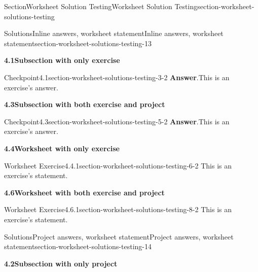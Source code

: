 \documentclass[oneside,10pt,]{article}
\newcommand{\blocktitlefont}{\relax}
\numberwithin{equation}{section}
\begin{document}
\begin{sectionptx}{Section}{Worksheet Solution Testing}{}{Worksheet Solution Testing}{}{}{section-worksheet-solutions-testing}
\typeout{************************************************}
%
\begin{solutions-subsection}{Solutions}{Inline answers, worksheet statement}{}{Inline answers, worksheet statement}{}{}{section-worksheet-solutions-testing-13}
\par\medskip
\noindent\textbf{\normalsize{}4.1\space\textperiodcentered\space{}Subsection with only exercise}
\begin{inlinesolution}{Checkpoint}{4.1}{}{section-worksheet-solutions-testing-3-2}%
\noindent\textbf{\blocktitlefont Answer}.\hypertarget{section-worksheet-solutions-testing-3-2-2-main}{}\quad{}This is an exercise's answer.%
\end{inlinesolution}%
\par\medskip
\noindent\textbf{\normalsize{}4.3\space\textperiodcentered\space{}Subsection with both exercise and project}
\begin{inlinesolution}{Checkpoint}{4.3}{}{section-worksheet-solutions-testing-5-2}%
\noindent\textbf{\blocktitlefont Answer}.\hypertarget{section-worksheet-solutions-testing-5-2-2-main}{}\quad{}This is an exercise's answer.%
\end{inlinesolution}%
\par\medskip
\noindent\textbf{\normalsize{}4.4\space\textperiodcentered\space{}Worksheet with only exercise}
\begin{divisionsolution}{Worksheet Exercise}{4.4.1}{}{section-worksheet-solutions-testing-6-2}%
This is an exercise's statement.%
\end{divisionsolution}%
\par\medskip
\noindent\textbf{\normalsize{}4.6\space\textperiodcentered\space{}Worksheet with both exercise and project}
\begin{divisionsolution}{Worksheet Exercise}{4.6.1}{}{section-worksheet-solutions-testing-8-2}%
This is an exercise's statement.%
\end{divisionsolution}%
\end{solutions-subsection}
%
%
\typeout{************************************************}
\typeout{************************************************}
%
\begin{solutions-subsection}{Solutions}{Project answers, worksheet statement}{}{Project answers, worksheet statement}{}{}{section-worksheet-solutions-testing-14}
\par\medskip
\noindent\textbf{\normalsize{}4.2\space\textperiodcentered\space{}Subsection with only project}

\end{solutions-subsection}
\end{sectionptx}
\end{document}
